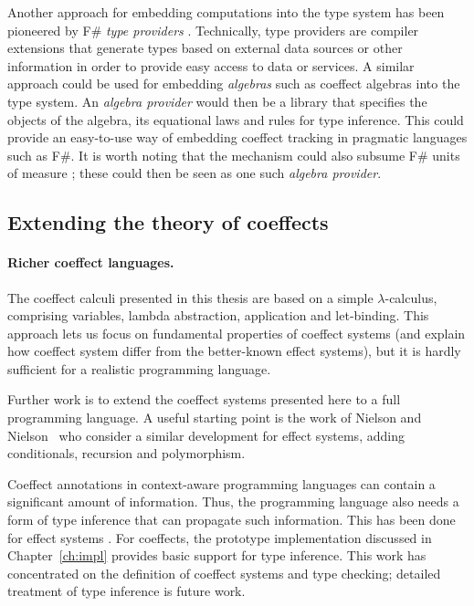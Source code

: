 Another approach for embedding computations into the type system has been pioneered by F\#
\emph{type providers} \cite{app-inforich}. Technically, type providers are compiler extensions
that generate types based on external data sources or other information in order to provide easy
access to data or services. A similar approach could be used for embedding \emph{algebras} such
as coeffect algebras into the type system. An \emph{algebra provider} would then be a library that
specifies the objects of the algebra, its equational laws and rules for type inference.
This could provide an easy-to-use way of embedding coeffect tracking in pragmatic languages
such as F\#. It is worth noting that the mechanism could also subsume F\# units of measure
\cite{types-units-of-measure}; these could then be seen as one such \emph{algebra
provider}.



\subsection{Extending the theory of coeffects }
\label{sec:further-theory}

\paragraph{Richer coeffect languages.}
The coeffect calculi presented in this thesis are based on a simple $\lambda$-calculus, comprising
variables, lambda abstraction, application and let-binding. This approach lets us focus on fundamental
properties of coeffect systems (and explain how coeffect system differ from the better-known effect
systems), but it is hardly sufficient for a realistic programming language.

Further work is to extend the coeffect systems presented here to a full programming language. A
useful starting point is the work of Nielson and Nielson~\cite{effects-nielson} who consider a
similar development for effect systems, adding conditionals, recursion and polymorphism.

Coeffect annotations in context-aware programming languages can contain a significant amount
of information. Thus, the programming language also needs a form of type inference that can propagate
such information. This has been done for effect systems \cite{effects-polymorphic}. For coeffects,
the prototype implementation discussed in Chapter~\ref{ch:impl} provides basic support for
type inference. This work has concentrated on the definition of coeffect systems and type checking;
detailed treatment of type inference is future work.

